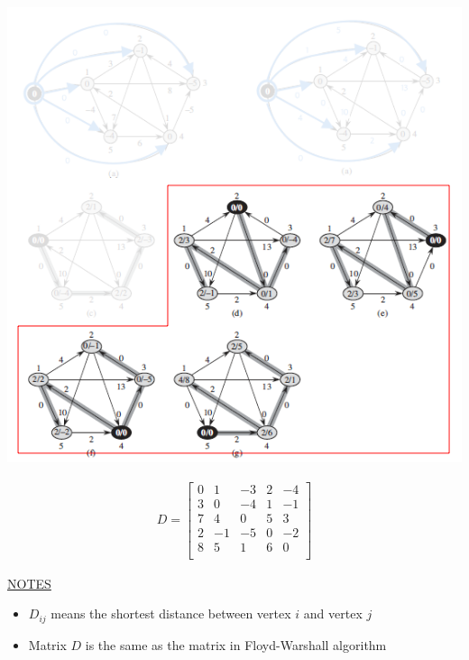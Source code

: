 \documentclass[12pt]{article}
\begin{document}
\begin{enumerate}[1.]
\begin{itemize}
\begin{enumerate}[1.]
\begin{enumerate}[a)]
                \begin{center}
                \includegraphics[width=\linewidth]{images/worksheet_4_solution_63.png}
                \end{center}

                \begin{align*}
                    D = \begin{bmatrix}
                        0 & 1 & -3 & 2 & -4\\
                        3 & 0 & -4 & 1 & -1\\
                        7 & 4 & 0 & 5 & 3\\
                        2 & -1 & -5 & 0 & -2\\
                        8 & 5 & 1 & 6 & 0\\
                    \end{bmatrix}
                \end{align*}

                \bigskip

                \underline{NOTES}

                \begin{itemize}
                    \item $D_{ij}$ means the shortest distance between vertex $i$ and vertex $j$
                    \item Matrix $D$ is the same as the matrix in Floyd-Warshall algorithm
                \end{itemize}
            \end{enumerate}


\end{enumerate}
\end{itemize}
\end{enumerate}
\end{document}
